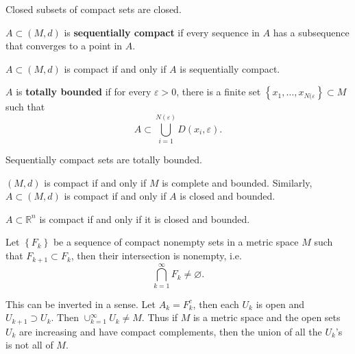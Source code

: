 \documentclass[10pt]{report}
\begin{document}
\begin{prop}
Closed subsets of compact sets are closed.
\end{prop}

\begin{defn}[]
	$A \subset (M,d)$ is \textbf{sequentially compact} if every sequence in $A$ has a subsequence that converges to a point in $A$.
\end{defn}

\begin{thrm}
	$A \subset (M,d)$ is compact if and only if $A$ is sequentially compact.
\end{thrm}

\begin{defn}[]
	$A$ is \textbf{totally bounded} if for every $\varepsilon>0$, there is a finite set $\left\{ x_1,\dots,x_{N(\varepsilon} \right\} \subset M$ such that \[A \subset \bigcup_{i=1}^{N(\varepsilon)} D(x_i,\varepsilon).\]
\end{defn}

\begin{prop}
Sequentially compact sets are totally bounded.
\end{prop}

\begin{thrm}[]
	$(M,d)$ is compact if and only if $M$ is complete and bounded. Similarly, $A \subset (M,d)$ is compact if and only if $A$ is closed and bounded.
\end{thrm}

\begin{thrm}
	$A \subset \mathbb{R}^n$ is compact if and only if it is closed and bounded.
\end{thrm}

\begin{thrm}
	Let $\left\{ F_k \right\}$ be a sequence of compact nonempty sets in a metric space $M$ such that $F_{k+1}\subset F_k$, then their intersection is nonempty, i.e.
	 \[
	\bigcap_{k=1}^\infty F_k \neq \varnothing.
	\] 
\end{thrm}

This can be inverted in a sense. Let $A_k = F_k^c$, then each $U_k$ is open and $U_{k+1} \supset U_k$. Then $\cup_{k=1}^\infty U_k \neq M$. Thus if $M$ is a metric space and the open sets $U_k$ are increasing and have compact complements, then the union of all the $U_k$'s is not all of $M$. 
\end{document}
